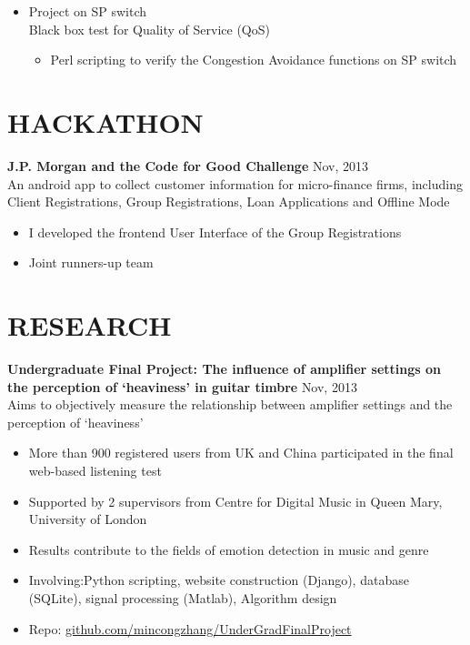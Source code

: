 \documentclass[line,margin]{res}
\begin{document}
\begin{resume}
\begin{itemize}
    \item Project on SP switch\\
    Black box test for Quality of Service (QoS)\vspace{-6pt}
    \begin{itemize}\itemsep -2pt %
        \item Perl scripting to verify the Congestion Avoidance functions on SP switch
    \end{itemize}

\end{itemize}

\section{HACKATHON} 
\renewcommand{\labelitemi}{-}

{\bf J.P. Morgan and the Code for Good Challenge}
\hfill{\textcolor[rgb]{0.7,0.7,0.7}{Nov, 2013}}\\
An android app to collect customer information for micro-finance firms, including Client Registrations, Group Registrations, Loan Applications and Offline Mode
\begin{itemize}\itemsep -2pt %
    \item I developed the frontend User Interface of the Group Registrations
    \item Joint runners-up team
\end{itemize}

\section{RESEARCH} 
{\bf Undergraduate Final Project: The influence of amplifier settings on the perception of `heaviness' in guitar timbre}
\hfill{\textcolor[rgb]{0.7,0.7,0.7}{Nov, 2013}}\\
Aims to objectively measure the relationship between amplifier settings and the perception of `heaviness'
\begin{itemize}\itemsep -2pt %
    \item More than 900 registered users from UK and China participated in the final web-based listening test
    \item Supported by 2 supervisors from Centre for Digital Music in Queen Mary, University of London
    \item Results contribute to the fields of emotion detection in music and genre
    \item Involving:Python scripting, website construction (Django), database (SQLite), signal processing (Matlab), Algorithm design
    \item Repo: \href{https://github.com/mincongzhang/UnderGradFinalProject}{github.com/mincongzhang/UnderGradFinalProject}
\end{itemize}


\end{resume}
\end{document}
